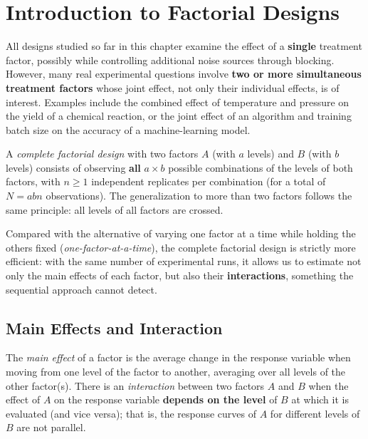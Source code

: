 \section{Introduction to Factorial Designs}

All designs studied so far in this chapter examine the effect of a \textbf{single} treatment factor, possibly while controlling additional noise sources through blocking. However, many real experimental questions involve \textbf{two or more simultaneous treatment factors} whose joint effect, not only their individual effects, is of interest. Examples include the combined effect of temperature and pressure on the yield of a chemical reaction, or the joint effect of an algorithm and training batch size on the accuracy of a machine-learning model.

\begin{definicion}
	A \emph{complete factorial design} with two factors $A$ (with $a$ levels) and $B$ (with $b$ levels) consists of observing \textbf{all} $a \times b$ possible combinations of the levels of both factors, with $n \geq 1$ independent replicates per combination (for a total of $N = abn$ observations). The generalization to more than two factors follows the same principle: all levels of all factors are crossed.
\end{definicion}

\begin{observacion}
	Compared with the alternative of varying one factor at a time while holding the others fixed (\emph{one-factor-at-a-time}), the complete factorial design is strictly more efficient: with the same number of experimental runs, it allows us to estimate not only the main effects of each factor, but also their \textbf{interactions}, something the sequential approach cannot detect.
\end{observacion}

\subsection{Main Effects and Interaction}

\begin{definicion}
	The \emph{main effect} of a factor is the average change in the response variable when moving from one level of the factor to another, averaging over all levels of the other factor(s). There is an \emph{interaction} between two factors $A$ and $B$ when the effect of $A$ on the response variable \textbf{depends on the level} of $B$ at which it is evaluated (and vice versa); that is, the response curves of $A$ for different levels of $B$ are not parallel.
\end{definicion}

